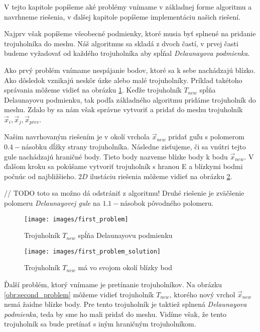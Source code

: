 V tejto kapitole popíšeme aké problémy vnímame v základnej forme algoritmu a navrhneme riešenia, v 
ďalšej kapitole popíšeme implementáciu našich riešení. 

Najprv však popíšeme všeobecné podmienky, ktoré musia byť splnené na pridanie trojuholníka do meshu.
Náš algoritmus sa skladá z dvoch častí, v prvej časti budeme vyžadovať od každého trojuholníka aby
spĺňal \textit{Delaunayova podmienka}.

Ako prvý problém vnímame nespájanie bodov, ktoré sa k sebe nachádzajú blízko. Ako dôsledok vznikajú neskôr
úzke alebo malé trojuholníky. Príklad takétoho správania môžeme vidieť na obrázku \ref{obr:first_problem}.
Keďže trojuholník $T_{new}$ spĺňa Delaunayovu podmienku, tak podľa základného algoritmu pridáme trojuholník
do meshu. Zdalo by sa nám však správne vytvoriť a pridať do meshu trojuholník 
$\overrightarrow{x}_i, \overrightarrow{x}_j, \overrightarrow{x}_{prev}$. 

Našim navrhovaným riešením je v okolí vrchola $\overrightarrow{x}_{new}$ pridať guľu s polomerom $0.4-$násobku 
dĺžky strany trojuholníka. Následne zisťujeme, či sa vnútri tejto gule nachádzajú hraničné body. 
Tieto body nazveme blízke body k bodu $\overrightarrow{x}_{new}$. V ďalšom kroku sa pokúšame vytvoriť trojuholník s
hranou E a blízkymi bodmi počnúc od najbližšieho. $2D$ ilustáciu riešenia môžeme vidieť na obrázku 
\ref{obr:first_problem_solution}. 

// TODO toto sa možno dá odstrániť z algoritmu!
Druhé riešenie je zväčšenie polomeru \textit{Delaunayovej gule} na $1.1-$násobok pôvodného polomeru.

\begin{figure}
    \centerline{\texttt{[image: images/first\_problem]}}
    \caption[Trojuholník $T_{new}$ spĺňa Delaunayovu podmienku]{Trojuholník $T_{new}$ spĺňa Delaunayovu podmienku}
    \label{obr:first_problem}
\end{figure}

\begin{figure}
    \centerline{\texttt{[image: images/first\_problem\_solution]}}
    \caption[Trojuholník $T_{new}$ má vo svojom okolí blízky bod]{Trojuholník $T_{new}$ má vo svojom okolí blízky bod}
    \label{obr:first_problem_solution}
\end{figure}

Ďalší problém, ktorý vnímame je pretínanie trojuholníkov. Na obrázku \ref{obr:second_problem} môžeme
vidieť trojuholník $T_{new}$, ktorého nový vrchol $\overrightarrow{x}_{new}$ nemá žaidne blízke body. Pre tento trojuholník
je taktiež splnená \textit{Delaunayova podmienka}, teda by sme ho mali pridať do meshu. Vidíme však, že
tento trojuholník sa bude pretínať s iným hraničným trojuholníkom.

